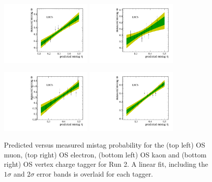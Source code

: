 \begin{figure}[h]
\centering
\includegraphics[height=!,width=0.4\textwidth]{figs/Tagging/Run2/OS_Muon_Calibration.pdf}
\includegraphics[height=!,width=0.4\textwidth]{figs/Tagging/Run2/OS_Electron_Calibration.pdf}

\includegraphics[height=!,width=0.4\textwidth]{figs/Tagging/Run2/OS_nnetKaon_Calibration.pdf}
\includegraphics[height=!,width=0.4\textwidth]{figs/Tagging/Run2/VtxCharge_Calibration.pdf}
\caption{Predicted versus measured mistag probability for the (top left) OS muon, (top right) OS electron, (bottom left) OS kaon and (bottom right) OS vertex charge tagger for Run 2. 
A linear fit, including the $1\sigma$ and $2\sigma$ error bands is overlaid for each tagger.}
\label{fig:OSdistribution_Run2}
\end{figure}

%
%


